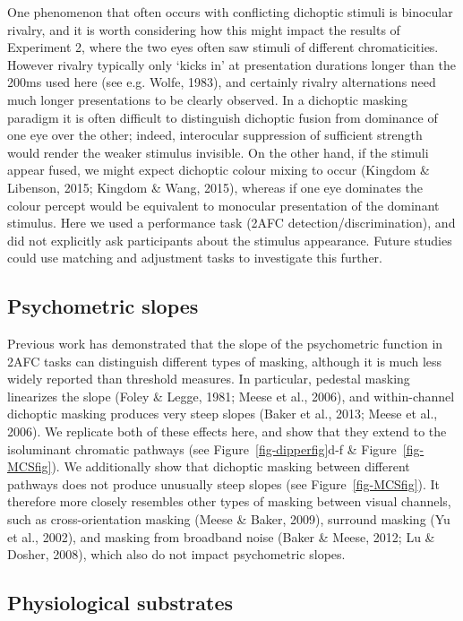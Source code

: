\documentclass[
  letterpaper,
  DIV=11,
  numbers=noendperiod]{scrartcl}
\begin{document}
One phenomenon that often occurs with conflicting dichoptic stimuli is
binocular rivalry, and it is worth considering how this might impact the
results of Experiment 2, where the two eyes often saw stimuli of
different chromaticities. However rivalry typically only `kicks in' at
presentation durations longer than the 200ms used here (see e.g. Wolfe,
1983), and certainly rivalry alternations need much longer presentations
to be clearly observed. In a dichoptic masking paradigm it is often
difficult to distinguish dichoptic fusion from dominance of one eye over
the other; indeed, interocular suppression of sufficient strength would
render the weaker stimulus invisible. On the other hand, if the stimuli
appear fused, we might expect dichoptic colour mixing to occur (Kingdom
\& Libenson, 2015; Kingdom \& Wang, 2015), whereas if one eye dominates
the colour percept would be equivalent to monocular presentation of the
dominant stimulus. Here we used a performance task (2AFC
detection/discrimination), and did not explicitly ask participants about
the stimulus appearance. Future studies could use matching and
adjustment tasks to investigate this further.

\subsection{Psychometric slopes}\label{psychometric-slopes}

Previous work has demonstrated that the slope of the psychometric
function in 2AFC tasks can distinguish different types of masking,
although it is much less widely reported than threshold measures. In
particular, pedestal masking linearizes the slope (Foley \& Legge, 1981;
Meese et al., 2006), and within-channel dichoptic masking produces very
steep slopes (Baker et al., 2013; Meese et al., 2006). We replicate both
of these effects here, and show that they extend to the isoluminant
chromatic pathways (see Figure~\ref{fig-dipperfig}d-f \&
Figure~\ref{fig-MCSfig}). We additionally show that dichoptic masking
between different pathways does not produce unusually steep slopes (see
Figure~\ref{fig-MCSfig}). It therefore more closely resembles other
types of masking between visual channels, such as cross-orientation
masking (Meese \& Baker, 2009), surround masking (Yu et al., 2002), and
masking from broadband noise (Baker \& Meese, 2012; Lu \& Dosher, 2008),
which also do not impact psychometric slopes.

\subsection{Physiological substrates}\label{physiological-substrates}
\end{document}

